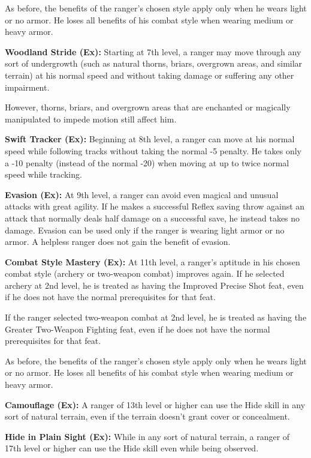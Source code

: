 \documentclass{article}
\begin{document}
As before, the benefits of the ranger's chosen style apply only when he wears light 
or no armor. He loses all benefits of his combat style when wearing medium or heavy 
armor.

\textbf{Woodland Stride (Ex):} Starting at 7th level, a ranger may move through 
any sort of undergrowth (such as natural thorns, briars, overgrown areas, and similar 
terrain) at his normal speed and without taking damage or suffering any other impairment.

However, thorns, briars, and overgrown areas that are enchanted or magically manipulated 
to impede motion still affect him.

\textbf{Swift Tracker (Ex):} Beginning at 8th level, a ranger can move at his normal 
speed while following tracks without taking the normal -5 penalty. He takes only 
a -10 penalty (instead of the normal -20) when moving at up to twice normal speed 
while tracking.

\textbf{Evasion (Ex):} At 9th level, a ranger can avoid even magical and unusual 
attacks with great agility. If he makes a successful Reflex saving throw against 
an attack that normally deals half damage on a successful save, he instead takes 
no damage. Evasion can be used only if the ranger is wearing light armor or no 
armor. A helpless ranger does not gain the benefit of evasion.

\textbf{Combat Style Mastery (Ex):} At 11th level, a ranger's aptitude in his chosen 
combat style (archery or two-weapon combat) improves again. If he selected archery 
at 2nd level, he is treated as having the Improved Precise Shot feat, even if he 
does not have the normal prerequisites for that feat.

If the ranger selected two-weapon combat at 2nd level, he is treated as having 
the Greater Two-Weapon Fighting feat, even if he does not have the normal prerequisites 
for that feat.

As before, the benefits of the ranger's chosen style apply only when he wears light 
or no armor. He loses all benefits of his combat style when wearing medium or heavy 
armor.

\textbf{Camouflage (Ex):} A ranger of 13th level or higher can use the Hide skill 
in any sort of natural terrain, even if the terrain doesn't grant cover or concealment.

\textbf{Hide in Plain Sight (Ex):} While in any sort of natural terrain, a ranger 
of 17th level or higher can use the Hide skill even while being observed.
\end{document}
